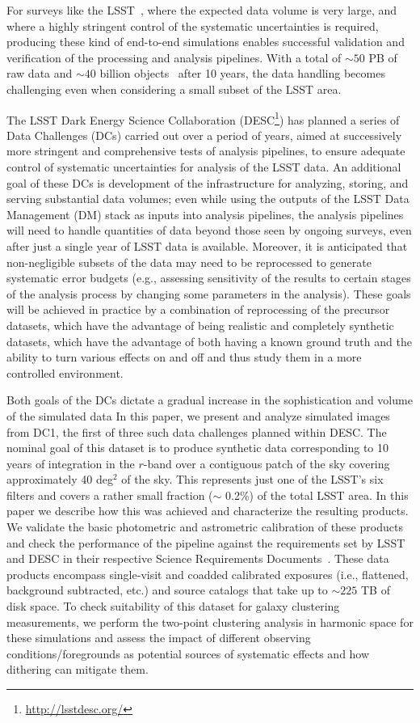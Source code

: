 \documentclass[twocolumn]{aastex62}
\begin{document}
For surveys like the LSST~\citep{Overview}, where the expected data volume is very large, and where a highly stringent control of the systematic uncertainties is required, producing these
kind of end-to-end simulations enables successful validation and verification of the processing and
analysis pipelines. With a total of $\sim 50$ PB of raw data and $\sim 40$ billion objects~\citep{Overview} after 10 years, the
data handling becomes challenging even when considering a small subset of the LSST area.  

The LSST Dark Energy Science Collaboration
(DESC\footnote{\url{http://lsstdesc.org/}}) has planned a series of
Data Challenges (DCs) carried out over a period of years, aimed at
successively more stringent and comprehensive tests of analysis
pipelines, to ensure adequate control of systematic uncertainties for
analysis of the LSST data.  An additional goal of these DCs is
development of the infrastructure for analyzing, storing, and serving
substantial data volumes; even while using the outputs of the LSST
Data Management (DM) stack as inputs into analysis pipelines, the
analysis pipelines will need to handle quantities of data beyond those
seen by ongoing surveys, even after just a single year of LSST data is
available. Moreover, it is anticipated that non-negligible subsets of
the data may need to be reprocessed to generate systematic error
budgets (e.g., assessing sensitivity of the results to certain stages
of the analysis process by changing some parameters in the
analysis). These goals will be achieved in practice by a combination
of reprocessing of the precursor datasets, which have the advantage of
being realistic and completely synthetic datasets, which have the
advantage of both having a known ground truth and the ability to turn
various effects on and off and thus study them in a more controlled
environment.

Both goals of the DCs dictate a gradual increase in the
sophistication and volume of the simulated data In this paper, we
present and analyze simulated images from DC1, the first of three such
data challenges planned within DESC. The nominal goal of this dataset
is to produce synthetic data corresponding to 10 years of integration
in the $r$-band over a contiguous patch of the sky covering approximately 40 deg$^{2}$ of the
sky. This represents just one of the LSST's six filters and covers a rather 
small fraction ($\sim$ 0.2\%) of the total LSST area. In this paper we
describe how this was achieved and  characterize the resulting
products. We validate the basic photometric and astrometric
calibration of these products and check the performance of the
pipeline against the requirements set by LSST and DESC in their
respective Science Requirements Documents~\citep{LPM-17,
  2018arXiv180901669T}. These data products encompass single-visit and
coadded calibrated exposures (i.e., flattened, background subtracted,
etc.) and source catalogs that take up to $\sim 225$ TB of disk
space. To check suitability of this dataset for galaxy clustering
measurements, we perform the two-point clustering analysis in harmonic space for these simulations and assess the impact of different observing conditions/foregrounds as potential sources of systematic effects and how dithering can mitigate them. 
\end{document}
